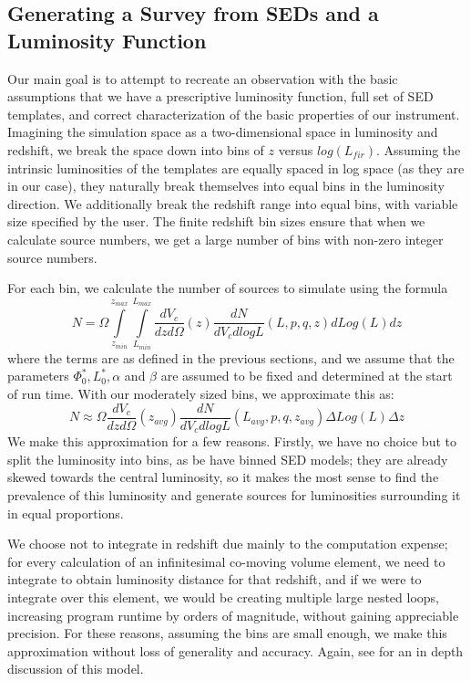 \documentclass[twocolumn,letterpaper,10pt]{article}
\begin{document}
\subsection{Generating a Survey from SEDs and a Luminosity Function}\label{generate}

Our main goal is to attempt to recreate an observation with the basic assumptions that we have a prescriptive luminosity function, full set of SED templates, and correct characterization of the basic properties of our instrument. Imagining the simulation space as a two-dimensional space in luminosity and redshift, we break the space down into bins of $z$ versus $log(L_{fir})$. Assuming the intrinsic luminosities of the templates are equally spaced in log space (as they are in our case), they naturally break themselves into equal bins in the luminosity direction. We additionally break the redshift range into equal bins, with variable size specified by the user. The finite redshift bin sizes ensure that when we calculate source numbers, we get a large number of bins with non-zero integer source numbers.

For each bin, we calculate the number of sources to simulate using the formula
$$
N=\Omega \int\limits_{z_{min}}^{z_{max}}\int\limits_{L_{min}}^{L_{max}}\frac{dV_c}{dzd\Omega}(z)\frac{dN}{dV_c dlogL}(L,p,q,z) dLog(L)dz
$$
where the terms are as defined in the previous sections, and we assume that the parameters $\Phi^*_0,L^*_0,\alpha$ and $\beta$ are assumed to be fixed and determined at the start of run time. With our moderately sized bins, we approximate this as:
$$
N\approx\Omega \frac{dV_c}{dzd\Omega}(z_{avg})\frac{dN}{dV_c dlogL}(L_{avg},p,q,z_{avg}) \Delta Log(L) \Delta z
$$
We make this approximation for a few reasons. Firstly, we have no choice but to split the luminosity into bins, as be have binned SED models; they are already skewed towards the central luminosity, so it makes the most sense to find the prevalence of this luminosity and generate sources for luminosities surrounding it in equal proportions. 

We choose not to integrate in redshift due mainly to the computation expense; for every calculation of an infinitesimal co-moving volume element, we need to integrate to obtain luminosity distance for that redshift, and if we were to integrate over this element, we would be creating multiple large nested loops, increasing program runtime by orders of magnitude, without gaining appreciable precision. For these reasons, assuming the bins are small enough, we make this approximation without loss of generality and accuracy. Again, see \citet{negrello13} for an in depth discussion of this model.
\end{document}
